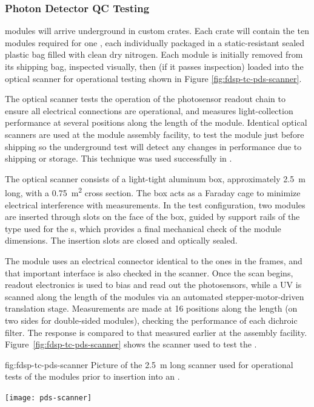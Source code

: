 \subsubsection{Photon Detector QC Testing}
 modules will arrive underground in custom crates.  
Each crate will contain the ten modules required for one , each individually packaged in a static-resistant sealed plastic bag filled with clean dry nitrogen. 
Each  module is initially removed from its shipping bag, inspected visually, then (if it passes inspection) loaded into the optical scanner for operational testing shown in Figure \ref{fig:fdsp-tc-pds-scanner}.

The optical scanner tests the operation of the photosensor readout chain to ensure all electrical connections are operational, and measures light-collection performance at several positions along the length of the module.
Identical optical scanners are used at the module assembly facility, to test the module just before shipping so the underground test will detect any changes in performance due to shipping or storage.  
This technique was used successfully in .

The optical scanner consists of a light-tight aluminum box, approximately \SI{2.5}{m} long, with a \SI{0.75}{\square\meter} cross section. 
The box acts as a Faraday cage to minimize electrical interference with measurements. In the  test configuration, two  modules are inserted through slots on the face of the box, guided by support rails of the type used for the s, which provides a final mechanical check of the  module dimensions.  
The insertion slots are closed and optically sealed.

The  module uses an electrical connector identical to the ones in the  frames, and that important interface is also checked in the scanner.  
Once the scan begins,   readout electronics is used to bias and read out the photosensors, while a UV  is scanned along the length of the modules via an automated stepper-motor-driven translation stage.  Measurements are made at 16 positions along the length (on two sides for double-sided  modules), checking the performance of each  dichroic filter. The response is compared to that measured earlier at the assembly facility. Figure~\ref{fig:fdsp-tc-pds-scanner} shows the scanner used to test the  .

\begin{dunefigure}{fig:fdsp-tc-pds-scanner}
{Picture of the \SI{2.5}{m} long scanner used for operational tests of the   modules prior to insertion into an .} 

\texttt{[image: pds-scanner]}
\end{dunefigure}

